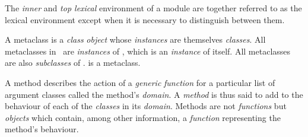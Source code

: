 \begin{optDefinition}
\begin{definitions}

     The
    {\em inner} and {\em top lexical} environment of a module are together
    referred to as the lexical environment except when it is necessary to
    distinguish between them.


      A metaclass is a {\em
        class} {\em object} whose {\em instances} are themselves {\em classes}.
    All metaclasses in \eulisp\ are {\em instances} of , which is
    an {\em instance} of itself.  All metaclasses are also {\em subclasses} of
    .   is a metaclass.

      A method describes the action of
    a {\em generic} {\em function} for a particular list of argument classes
    called the method's {\em domain}.  A {\em method} is thus said to add to the
    behaviour of each of the {\em classes} in its {\em domain}.  Methods are not
    {\em functions} but {\em objects} which contain, among other information, a
    {\em function} representing the method's behaviour.



\end{definitions}
\end{optDefinition}
